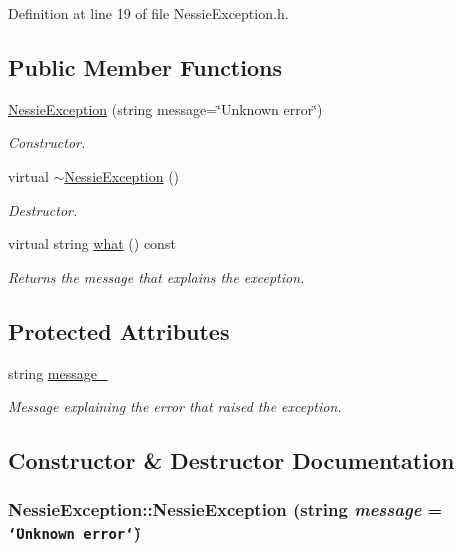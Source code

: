 Definition at line 19 of file NessieException.h.\subsection*{Public Member Functions}
\begin{CompactItemize}
\item 
\hyperlink{class_nessie_exception_1287f5b04f2f46162fcfae79699dcae7}{NessieException} (string message=\char`\"{}Unknown error\char`\"{})
\begin{CompactList}\small\item\em Constructor. \item\end{CompactList}\item 
virtual \hyperlink{class_nessie_exception_19f44d2725dd53e2f10505a88e5773f2}{$\sim$NessieException} ()
\begin{CompactList}\small\item\em Destructor. \item\end{CompactList}\item 
virtual string \hyperlink{class_nessie_exception_ec94145f2fd5febb7ca0b7587652b777}{what} () const 
\begin{CompactList}\small\item\em Returns the message that explains the exception. \item\end{CompactList}\end{CompactItemize}
\subsection*{Protected Attributes}
\begin{CompactItemize}
\item 
\hypertarget{class_nessie_exception_dfc0c53684fe26e2199beeb9b62841f5}{
string \hyperlink{class_nessie_exception_dfc0c53684fe26e2199beeb9b62841f5}{message\_\-}}
\label{class_nessie_exception_dfc0c53684fe26e2199beeb9b62841f5}

\begin{CompactList}\small\item\em Message explaining the error that raised the exception. \item\end{CompactList}\end{CompactItemize}


\subsection{Constructor \& Destructor Documentation}
\hypertarget{class_nessie_exception_1287f5b04f2f46162fcfae79699dcae7}{
\subsubsection[NessieException]{\setlength{\rightskip}{0pt plus 5cm}NessieException::NessieException (string {\em message} = {\tt \char`\"{}Unknown~error\char`\"{}})}}
\label{class_nessie_exception_1287f5b04f2f46162fcfae79699dcae7}


